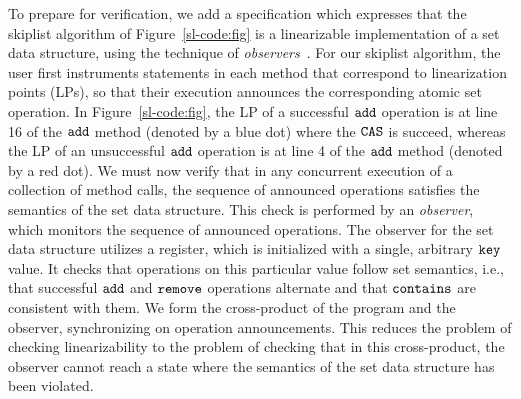 To prepare for verification, we add a specification which expresses that
the skiplist algorithm of Figure~\ref{sl-code:fig} is a
linearizable implementation of a set data structure, using
the technique of
{\em observers}~\cite{AHHR:integrated,BEEH:icalp15,HSV:concur13,Quy:sas16}.
For our skiplist algorithm, the user first instruments statements in each
method that correspond to linearization points (LPs), so that their execution
announces the corresponding atomic set operation.
In Figure~\ref{sl-code:fig}, the LP of a successful ${\tt add}$ operation is at line 16 of the $\tt add$ method (denoted by a blue dot) where the $\tt CAS$ is succeed, whereas the LP of an unsuccessful $\tt add$ operation is at line 4 of the $\tt add$
method (denoted by a red dot).
We must now verify that in any concurrent
execution of a collection of method calls, the sequence of announced
operations satisfies the semantics of the set data structure.
This check is performed by an {\em observer}, which
monitors the sequence of announced operations. The observer for the set
data structure utilizes a register, which is initialized with
a single, arbitrary $\tt key$ value.
It checks that operations on this particular value follow set semantics,
i.e., that successful $\tt add$ and $\tt remove$ operations alternate and that
$\tt contains$ are consistent with them.
We form %
the cross-product of the program  and the observer, synchronizing on
operation announcements. This reduces the
problem of checking linearizability to the problem of checking that
in this cross-product, the observer cannot reach a state where
the semantics of the set data structure has been violated.




